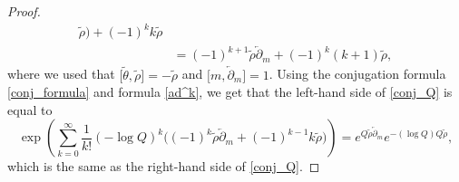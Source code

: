 \documentclass[10pt,a4paper]{article}
\numberwithin{equation}{section}
\begin{document}
\begin{proof}
\begin{align*}
\widetilde{\rho}\big) +(-1)^k k \widetilde{\rho}\\
&=
(-1)^{k+1} \widetilde{\rho} \overleftarrow{\partial}_m+
(-1)^{k} (k+1) \widetilde{\rho},
\end{align*}
where we used that
$\big[\widetilde{\theta},\widetilde{\rho}\big]=-\widetilde{\rho}$ and
$\big[m,\overleftarrow{\partial}_m\big]=1$.
Using the conjugation formula \eqref{conj_formula} and formula
\eqref{ad^k}, we get that the left-hand side of \eqref{conj_Q} is equal to
\[
\exp\left(
\sum_{k=0}^\infty \frac{1}{k!} (-\log Q)^k\big(
(-1)^{k} \widetilde{\rho} \overleftarrow{\partial}_m+
(-1)^{k-1} k \widetilde{\rho}\big)\right) =
e^{Q \widetilde{\rho} \overleftarrow{\partial}_m}
e^{-(\log Q) Q \widetilde{\rho}},
\]
which is the same as the right-hand side of \eqref{conj_Q}.
\end{proof}
\end{document}

